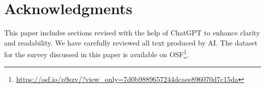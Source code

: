\documentclass[sigconf,screen,review,anonymous]{acmart}
\begin{document}
\appendix

\section{Acknowledgments}
This paper includes sections revised with the help of ChatGPT to enhance clarity and readability.
We have carefully reviewed all text produced by AI.
The dataset for the survey discussed in this paper is available on OSF\footnote{\url{https://osf.io/p9szv/?view_only=7d0b9889657244dcaee896070d7c15da}}.



\end{document}

